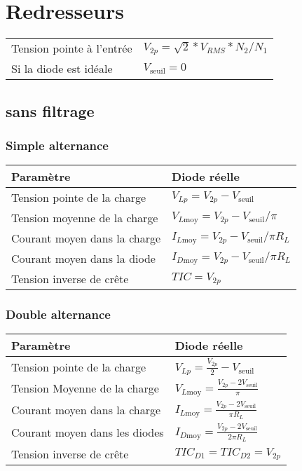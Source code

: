 \section{Redresseurs}
\renewcommand{\arraystretch}{1.25}
\begin{tabular}{ll}
    Tension pointe à l'entrée & \( V_{2p}= \sqrt{2}*V_{RMS} * N_2/N_1\)\\
    Si la diode est idéale & \(V_{\mathrm{seuil}}=0\)
\end{tabular}

\subsection{sans filtrage}
\subsubsection{Simple alternance}
\begin{tabular}{ll}
    Paramètre & Diode réelle \\\hline
    Tension pointe de la charge & \(V_{Lp}=V_{2p}-V_{\mathrm{seuil}}\)\\
    Tension moyenne de la charge & \(V_{L\mathrm{moy}}=V_{2p}-V_{\mathrm{seuil}}/\pi \)\\
    Courant moyen dans la charge & \(I_{L\mathrm{moy}}=V_{2p}-V_{\mathrm{seuil}}/\pi R_{L} \)\\
    Courant moyen dans la diode &  \(I_{D\mathrm{moy}}=V_{2p}-V_{\mathrm{seuil}}/\pi R_{L} \)\\
    Tension inverse de crête & \(TIC=V_{2p}\)
\end{tabular}

\subsubsection{Double alternance}
\renewcommand{\arraystretch}{2}
\begin{tabular}{ll}
    Paramètre & Diode réelle \\\hline
    Tension pointe de la charge & \(V_{Lp}=\frac{V_{2p}}{2}-V_{\mathrm{seuil}}\)\\
    Tension Moyenne de la charge & \(V_{L\mathrm{moy}}=\frac{V_{2p}-2V_{\mathrm{seuil}}}{\pi}\)\\
    Courant moyen dans la charge & \(I_{L\mathrm{moy}}=\frac{V_{2p}-2V_{\mathrm{seuil}}}{\pi R_L}\)\\
    Courant moyen dans les diodes &  \(I_{D\mathrm{moy}}=\frac{V_{2p}-2V_{\mathrm{seuil}}}{2\pi R_L}\)\\
    Tension inverse de crête & \(TIC_{D1} = TIC_{D2}=V_{2p}\)
\end{tabular}


